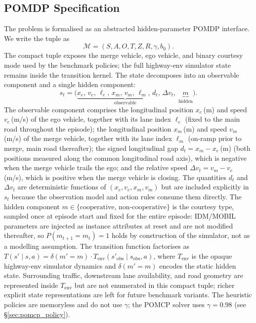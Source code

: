 \subsection{POMDP Specification}
\label{sec:pomdp}
The problem is formalised as an abstracted hidden-parameter POMDP interface.
We write the tuple as
\[
  \mathcal{M}{=}(S,A,O,T,Z,R,\gamma,b_0).
\]
The compact tuple exposes the merge vehicle, ego vehicle, and binary courtesy
mode used by the benchmark policies; the full highway-env simulator state
remains inside the transition kernel.
The state decomposes into an observable component and a single hidden
component:
\[
  s_t = \bigl(\underbrace{x_e,\,v_e,\,\ell_e,\,x_m,\,v_m,\,\ell_m,\,
  d_t,\,\Delta v_t}_{\text{observable}},\;
  \underbrace{m}_{\text{hidden}}\bigr).
\]
The observable component comprises the longitudinal position $x_e$\,(m)
and speed $v_e$\,(m/s) of the ego vehicle, together with its lane index
$\ell_e$ (fixed to the main road throughout the episode); the longitudinal
position $x_m$\,(m) and speed $v_m$\,(m/s) of the merge vehicle, together
with its lane index $\ell_m$ (on-ramp prior to merge, main road thereafter);
the signed longitudinal gap $d_t{=}x_m{-}x_e$\,(m) (both positions measured
along the common longitudinal road axis), which is negative when
the merge vehicle trails the ego; and the relative speed
$\Delta v_t{=}v_m{-}v_e$\,(m/s), which is positive when the merge vehicle
is closing.
The quantities $d_t$ and $\Delta v_t$ are deterministic functions of
$(x_e,v_e,x_m,v_m)$ but are included explicitly in $s_t$ because the
observation model and action rules consume them directly.
The hidden component $m\in\{\text{cooperative},\,\text{non-cooperative}\}$
is the courtesy type, sampled once at episode start and fixed for the entire
episode: IDM/MOBIL parameters are injected as instance attributes at reset
and are not modified thereafter, so $P(m_{t+1}{=}m_t){=}1$ holds by
construction of the simulator, not as a modelling assumption.
The transition function factorises as
$T(s'\!\mid\!s,a) = \delta(m'{=}m)\cdot T_{\!\text{env}}(s'_{\text{obs}}\mid s_{\text{obs}},a)$,
where $T_{\!\text{env}}$ is the opaque highway-env simulator dynamics and
$\delta(m'{=}m)$ encodes the static hidden state.
Surrounding traffic, downstream lane availability, and road geometry are
represented inside $T_{\!\text{env}}$ but are not enumerated in this compact
tuple; richer explicit state representations are left for future benchmark
variants.
The heuristic policies are memoryless and do not use $\gamma$; the POMCP
solver uses $\gamma{=}0.98$ (see \S\ref{sec:pomcp_policy}).

